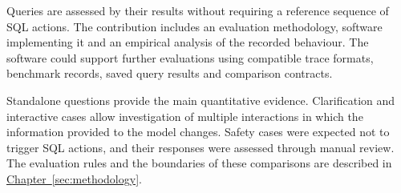 Queries are assessed by their results without requiring a reference sequence of SQL actions. 
The contribution includes an evaluation methodology, software implementing it 
and an empirical analysis of the recorded behaviour. 
The software could support further evaluations using compatible trace formats, 
benchmark records, saved query results and comparison contracts.

Standalone questions provide the main quantitative evidence. 
Clarification and interactive cases allow investigation 
of multiple interactions in which the information provided to the model changes.
Safety cases were expected not to trigger SQL actions, 
and their responses were assessed through manual review. 
The evaluation rules and the boundaries of these comparisons 
are described in \hyperref[sec:methodology]{Chapter~\ref*{sec:methodology}}.